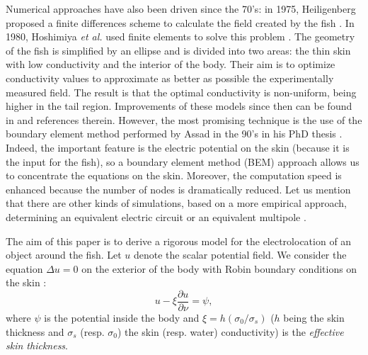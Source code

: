 \documentclass[final]{siamltex}
\numberwithin{equation}{section}
\numberwithin{figure}{section}
\numberwithin{table}{section}
\begin{document}
Numerical approaches have also been driven since the 70's: in
1975, Heiligenberg proposed a finite differences scheme to
calculate the field created by the fish
\cite{heiligenberg1975theoretical}. In 1980, Hoshimiya {\it et
al.} used finite elements to solve this problem
\cite{hoshimiya1980theapteronotus}. The geometry of the fish is
simplified by an ellipse and is divided into two areas: the thin
skin with low conductivity and the interior of the body. Their aim
is to optimize conductivity values to approximate as better as
possible the experimentally measured field. The result is that the
optimal conductivity is non-uniform, being higher in the tail
region. Improvements of these models since then can be found in
\cite{babineau2006modeling,maciver2001computational,migliaro2005theoretical,rasnow1989simulation}
and references therein. However, the most promising technique is
the use of the boundary element method performed by Assad in the
90's in his PhD thesis \cite{assad1997electric}. Indeed, the
important feature is the electric potential on the skin (because
it is the input for the fish), so a boundary element method (BEM)
approach allows us to concentrate the equations on the skin.
Moreover, the computation speed is enhanced because the number of
nodes is dramatically reduced. Let us mention that there are other
kinds of simulations, based on a more empirical approach,
determining an equivalent electric circuit
\cite{budelli2000electric,caputi1998electric} or an equivalent
multipole \cite{chen2005modeling}.



The aim of this paper is to derive a rigorous model for the
electrolocation of an object around the fish. Let $u$ denote the
scalar potential field. We consider the equation $\Delta u=0$ on
the exterior of the body with Robin boundary conditions on the
skin \cite{assad1990hypercube}:
\begin{equation}
u-\xi\frac{\partial u}{\partial\nu}=\psi,\label{eq:assad_BC}
\end{equation}
 where $\psi$ is the potential inside the body and $\xi=h(\sigma_{0}/\sigma_{s})$
($h$ being the skin thickness and $\sigma_{s}$ (resp.
$\sigma_{0}$) the skin (resp. water) conductivity) is the
\emph{effective skin thickness}.
\end{document}
